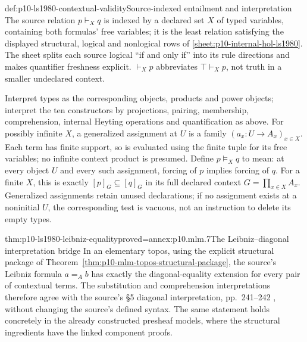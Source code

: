 \begin{hbdefinition}{def:p10-ls1980-contextual-validity}{Source-indexed entailment and interpretation}
The source relation \(p\vdash_Xq\) is indexed by a declared set \(X\) of
typed variables, containing both formulas' free variables; it is the least
relation satisfying the displayed structural, logical and nonlogical rows
of \ref{sheet:p10-internal-hol-ls1980}. The sheet splits each source logical
``if and only if'' into its rule directions and makes quantifier freshness
explicit. \(\vdash_Xp\) abbreviates \(\top\vdash_Xp\), not truth in a smaller
undeclared context.

Interpret types as the corresponding objects, products and power objects;
interpret the ten constructors by projections, pairing, membership,
comprehension, internal Heyting operations and quantification as above.
For possibly infinite \(X\), a generalized assignment at \(U\) is a family
\((a_x:U\to A_x)_{x\in X}\). Each term has finite support, so is evaluated
using the finite tuple for its free variables; no infinite context product
is presumed. Define \(p\models_Xq\) to mean: at every object \(U\) and every
such assignment, forcing of \(p\) implies forcing of \(q\).
For a finite \(X\), this is exactly
\([p]_G\subseteq[q]_G\) in its full declared context \(G=\prod_{x\in X}A_x\).
Generalized assignments retain unused declarations; if no assignment exists
at a noninitial \(U\), the corresponding test is vacuous, not an instruction
to delete its empty types.
\end{hbdefinition}

\begin{hbtheorem}{thm:p10-ls1980-leibniz-equality}{proved=annex:p10.mlm.7}{The Leibniz--diagonal interpretation bridge}
In an elementary topos, using the explicit structural package of
Theorem~\ref{thm:p10-mlm-topos-structural-package}, the source's Leibniz
formula \(a=_Ab\) has exactly the diagonal-equality extension for every pair
of contextual terms. The substitution and comprehension interpretations
therefore agree with the source's \S5 diagonal interpretation, pp.~241--242
\cite{LambekScott1980ITT}, without changing the source's defined syntax.
The same statement holds concretely in the already constructed presheaf
models, where the structural ingredients have the linked component proofs.
\end{hbtheorem}



